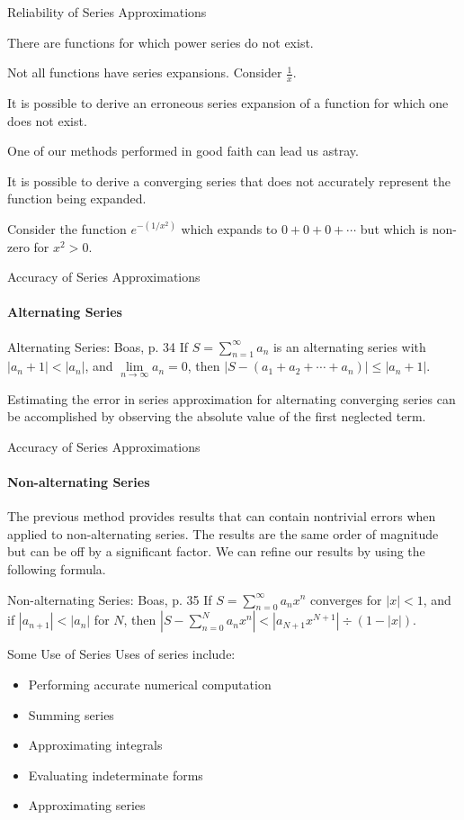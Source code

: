 \documentclass{beamer}
\begin{document}
\begin{frame}{Reliability of Series Approximations}
	\begin{alertblock}{}
	There are functions for which power series do not exist.
	\end{alertblock}
	Not all functions have series expansions.  Consider $\frac{1}{x}$.
	\begin{alertblock}{}
	It is possible to derive an erroneous series expansion of a function for which one does not exist.
	\end{alertblock}
	One of our methods performed in good faith can lead us astray.
	\begin{alertblock}{}
	It is possible to derive a converging series that does not accurately represent the function being expanded.
	\end{alertblock}
	Consider the function $e^{-(1/x^2)}$ which expands to $0+0+0+\cdots$ but which is non-zero for $x^2>0$.
\end{frame}
  
\begin{frame}{Accuracy of Series Approximations}
	\framesubtitle{Alternating Series}
	\begin{block}{Alternating Series: Boas, p. 34}
	If $S=\sum\limits_{n=1}^\infty a_n$ is an alternating series with $|a_n+1|<|a_n|$, and $\lim\limits_{n\to\infty}a_n=0$, then $|S-(a_1+a_2+\cdots +a_n)|\leq |a_n+1|$.
	\end{block}
	Estimating the error in series approximation for alternating converging series can be accomplished by observing the absolute value of the first neglected term.
\end{frame}
  
\begin{frame}{Accuracy of Series Approximations}
	\framesubtitle{Non-alternating Series}
	The previous method provides results that can contain nontrivial errors when applied to non-alternating series.  The results are the same order of magnitude but can be off by a significant factor.  We can refine our results by using the following formula.
	\begin{block}{Non-alternating Series: Boas, p. 35}
	If $S=\sum\limits_{n=0}^\infty a_n x^n$ converges for $|x|<1$, and if $|a_{n+1}|<|a_n|$ for $N$, then $\left\lvert S-\sum\limits_{n=0}^N a_n x^n \right\rvert<|a_{N+1}x^{N+1}|\div(1-|x|)$.
	\end{block}
\end{frame}
  
\begin{frame}{Some Use of Series}
	Uses of series include:
	\begin{itemize}
		\item Performing accurate numerical computation
		\item Summing series
		\item Approximating integrals
		\item Evaluating indeterminate forms
		\item Approximating series
	\end{itemize}
\end{frame}
  
\end{document}
